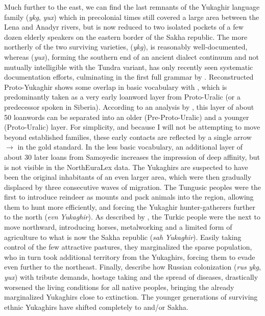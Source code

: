 Much further to the east, we can find the last remnants of the Yukaghir language family (\textit{ykg}, \textit{yux}) which in precolonial times still covered a large area between the Lena and Anadyr rivers, but is now reduced to two isolated pockets of a few dozen elderly speakers on the eastern border of the Sakha republic. The more northerly of the two surviving varieties,  (\textit{ykg}), is reasonably well-documented, whereas  (\textit{yux}), forming the southern end of an ancient dialect continuum and not mutually intelligible with the Tundra variant, has only recently seen systematic documentation efforts, culminating in the first full grammar by \cite{maslova2003}. Reconstructed Proto-Yukaghir shows some overlap in basic vocabulary with , which is predominantly taken as a very early loanword layer from Proto-Uralic (or a predecessor spoken in Siberia). According to an analysis by \cite{hakkinen2012}, this layer of
about 50 loanwords can be separated into an older (Pre-Proto-Uralic) and a younger (Proto-Uralic) layer. For simplicity, and because I will not be attempting to move beyond established families, these early contacts are reflected by a single arrow  $\rightarrow$  in the gold standard. In the less basic vocabulary, an additional layer of about 30 later loans from Samoyedic increases the impression of deep affinity, but is not visible in the NorthEuraLex data. The Yukaghirs are suspected to have been the original inhabitants of an even larger area, which were then gradually displaced by three consecutive waves of migration. The Tungusic peoples were the first to introduce reindeer as mounts and pack animals into the region, allowing them to hunt more efficiently, and forcing the Yukaghir hunter-gatherers further to the north (\textit{evn} \arrowLA \textit{Yukaghir}). As described by \cite[p. 52]{menges1995}, the Turkic  people were the next to move northward,
introducing horses, metalworking and a limited form of agriculture to what is now the Sakha republic (\textit{sah} \arrowLA \textit{Yukaghir}). Easily taking control of the few attractive pastures, they marginalized the sparse  population, who in turn took additional territory from the Yukaghirs, forcing them to evade even further to the northeast. Finally, \cite{viires_vahtre_1993} describe how Russian colonization (\textit{rus} \arrowLA \textit{ykg}, \textit{yux}) with tribute demands, hostage taking and the spread of diseases, drastically worsened the living conditions for all native peoples, bringing the already marginalized Yukaghirs close to extinction. The younger generations of surviving ethnic Yukaghirs have shifted completely to  and/or Sakha.

